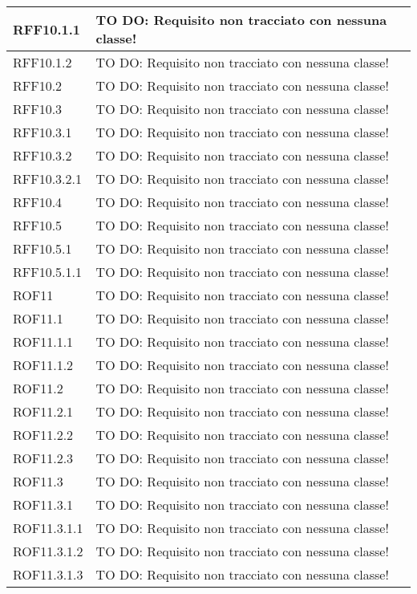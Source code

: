 \begin{center}
\begin{longtable}{| p{2.5cm} | p{11cm} |}
\hline
RFF10.1.1 & TO DO: Requisito non tracciato con nessuna classe! \\
\hline
RFF10.1.2 & TO DO: Requisito non tracciato con nessuna classe! \\
\hline
RFF10.2 & TO DO: Requisito non tracciato con nessuna classe! \\
\hline
RFF10.3 & TO DO: Requisito non tracciato con nessuna classe! \\
\hline
RFF10.3.1 & TO DO: Requisito non tracciato con nessuna classe! \\
\hline
RFF10.3.2 & TO DO: Requisito non tracciato con nessuna classe! \\
\hline
RFF10.3.2.1 & TO DO: Requisito non tracciato con nessuna classe! \\
\hline
RFF10.4 & TO DO: Requisito non tracciato con nessuna classe! \\
\hline
RFF10.5 & TO DO: Requisito non tracciato con nessuna classe! \\
\hline
RFF10.5.1 & TO DO: Requisito non tracciato con nessuna classe! \\
\hline
RFF10.5.1.1 & TO DO: Requisito non tracciato con nessuna classe! \\
\hline
ROF11 & TO DO: Requisito non tracciato con nessuna classe! \\
\hline
ROF11.1 & TO DO: Requisito non tracciato con nessuna classe! \\
\hline
ROF11.1.1 & TO DO: Requisito non tracciato con nessuna classe! \\
\hline
ROF11.1.2 & TO DO: Requisito non tracciato con nessuna classe! \\
\hline
ROF11.2 & TO DO: Requisito non tracciato con nessuna classe! \\
\hline
ROF11.2.1 & TO DO: Requisito non tracciato con nessuna classe! \\
\hline
ROF11.2.2 & TO DO: Requisito non tracciato con nessuna classe! \\
\hline
ROF11.2.3 & TO DO: Requisito non tracciato con nessuna classe! \\
\hline
ROF11.3 & TO DO: Requisito non tracciato con nessuna classe! \\
\hline
ROF11.3.1 & TO DO: Requisito non tracciato con nessuna classe! \\
\hline
ROF11.3.1.1 & TO DO: Requisito non tracciato con nessuna classe! \\
\hline
ROF11.3.1.2 & TO DO: Requisito non tracciato con nessuna classe! \\
\hline
ROF11.3.1.3 & TO DO: Requisito non tracciato con nessuna classe! \\

\end{longtable}
\end{center}
